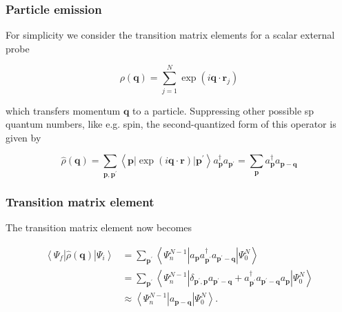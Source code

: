 \documentclass[compress]{beamer}
\begin{document}
\frame
{
\frametitle{Particle emission}
\begin{small}
{\scriptsize
For simplicity we consider the transition matrix elements for a scalar external probe

$$
\rho(\boldsymbol{q})=\sum_{j=1}^{N} \exp \left(i \boldsymbol{q} \cdot \boldsymbol{r}_{j}\right)
$$

which transfers momentum $\boldsymbol{q}$ to a particle. Suppressing other possible sp quantum numbers, like e.g. spin, the second-quantized form of this operator is given by

$$
\hat{\rho}(\boldsymbol{q})=\sum_{\boldsymbol{p}, \boldsymbol{p}^{\prime}}\left\langle\boldsymbol{p}|\exp (i \boldsymbol{q} \cdot \boldsymbol{r})| \boldsymbol{p}^{\prime}\right\rangle a_{\boldsymbol{p}}^{\dagger} a_{\boldsymbol{p}^{\prime}}=\sum_{\boldsymbol{p}} a_{\boldsymbol{p}}^{\dagger} a_{\boldsymbol{p}-\boldsymbol{q}}
$$

}
\end{small}
}
\frame
{
\frametitle{Transition matrix element}
\begin{small}
{\scriptsize
The transition matrix element now becomes

$$
\begin{aligned}
\left\langle\Psi_{f}|\hat{\rho}(\boldsymbol{q})| \Psi_{i}\right\rangle & =\sum_{\boldsymbol{p}^{\prime}}\left\langle\Psi_{n}^{N-1}\left|a_{\boldsymbol{p}} a_{\boldsymbol{p}^{\prime}}^{\dagger} a_{\boldsymbol{p}^{\prime}-\boldsymbol{q}}\right| \Psi_{0}^{N}\right\rangle \\
& =\sum_{\boldsymbol{p}^{\prime}}\left\langle\Psi_{n}^{N-1}\left|\delta_{\boldsymbol{p}^{\prime}, \boldsymbol{p}} a_{\boldsymbol{p}^{\prime}-\boldsymbol{q}}+a_{\boldsymbol{p}^{\prime}}^{\dagger} a_{\boldsymbol{p}^{\prime}-\boldsymbol{q}} a_{\boldsymbol{p}}\right| \Psi_{0}^{N}\right\rangle \\
& \approx\left\langle\Psi_{n}^{N-1}\left|a_{\boldsymbol{p}-\boldsymbol{q}}\right| \Psi_{0}^{N}\right\rangle .
\end{aligned}
$$

}
\end{small}
}
\frame
\end{document}
